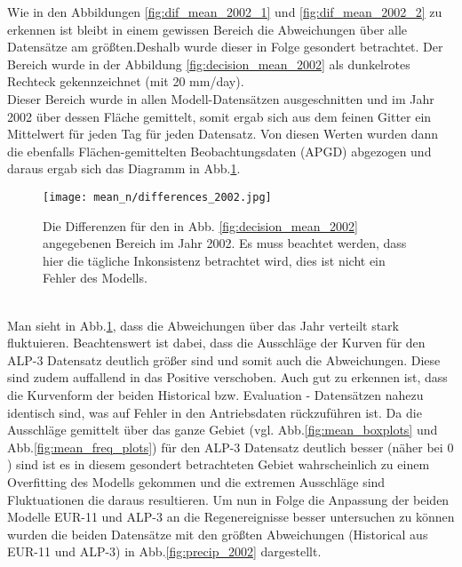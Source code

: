 Wie in den Abbildungen \ref{fig:dif_mean_2002_1} und \ref{fig:dif_mean_2002_2} zu erkennen ist bleibt in einem gewissen Bereich die Abweichungen über alle Datensätze am größten.Deshalb wurde dieser in Folge gesondert betrachtet. Der Bereich wurde in der Abbildung \ref{fig:decision_mean_2002} als dunkelrotes Rechteck gekennzeichnet (mit 20 mm/day).\\
Dieser Bereich wurde in allen Modell-Datensätzen ausgeschnitten und im Jahr 2002 über dessen Fläche gemittelt, somit ergab sich aus dem feinen Gitter ein Mittelwert für jeden Tag für jeden Datensatz. Von diesen Werten wurden dann die ebenfalls Flächen-gemittelten Beobachtungsdaten (APGD) abgezogen und daraus ergab sich das Diagramm in Abb.\ref{fig:diff_2002}.\\
\begin{figure}[h]
	\texttt{[image: mean\_n/differences\_2002.jpg]}
	\caption{Die Differenzen für den in Abb. \ref{fig:decision_mean_2002} angegebenen Bereich im Jahr 2002. Es muss beachtet werden, dass hier die tägliche Inkonsistenz betrachtet wird, dies ist nicht ein Fehler des Modells.}
	\label{fig:diff_2002}
\end{figure}\\
Man sieht in Abb.\ref{fig:diff_2002}, dass die Abweichungen über das Jahr verteilt stark fluktuieren. Beachtenswert ist dabei, dass die Ausschläge der Kurven für den ALP-3 Datensatz deutlich größer sind und somit auch die Abweichungen. Diese sind zudem auffallend in das Positive verschoben. Auch gut zu erkennen ist, dass die Kurvenform der beiden Historical bzw. Evaluation - Datensätzen nahezu identisch sind, was auf Fehler in den Antriebsdaten rückzuführen ist. Da die Ausschläge gemittelt über das ganze Gebiet (vgl. Abb.\ref{fig:mean_boxplots} und Abb.\ref{fig:mean_freq_plots}) für den ALP-3 Datensatz deutlich besser (näher bei $0$) sind ist es in diesem gesondert betrachteten Gebiet wahrscheinlich zu einem Overfitting des Modells gekommen und die extremen Ausschläge sind Fluktuationen die daraus resultieren. Um nun in Folge die Anpassung der beiden Modelle EUR-11 und ALP-3 an die Regenereignisse besser untersuchen zu können wurden die beiden Datensätze mit den größten Abweichungen (Historical aus EUR-11 und ALP-3) in Abb.\ref{fig:precip_2002} dargestellt.\\

